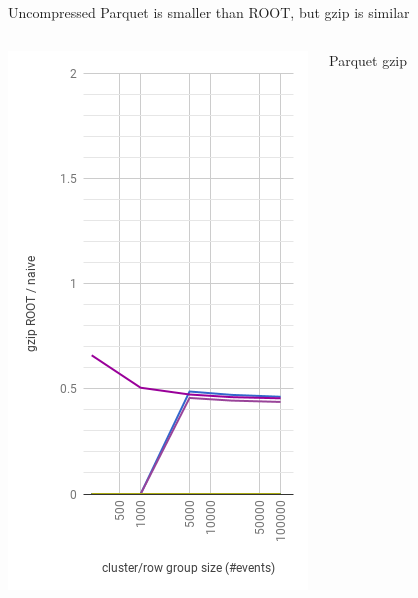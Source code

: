 \documentclass[aspectratio=169]{beamer}
\begin{document}
\begin{frame}{Uncompressed Parquet is smaller than ROOT, but gzip is similar}
\begin{columns}
\begin{center}
\includegraphics[width=\linewidth]{root-gzip.png}
\end{center}
\begin{center}
Parquet gzip


\end{center}
\end{columns}
\end{frame}
\end{document}
